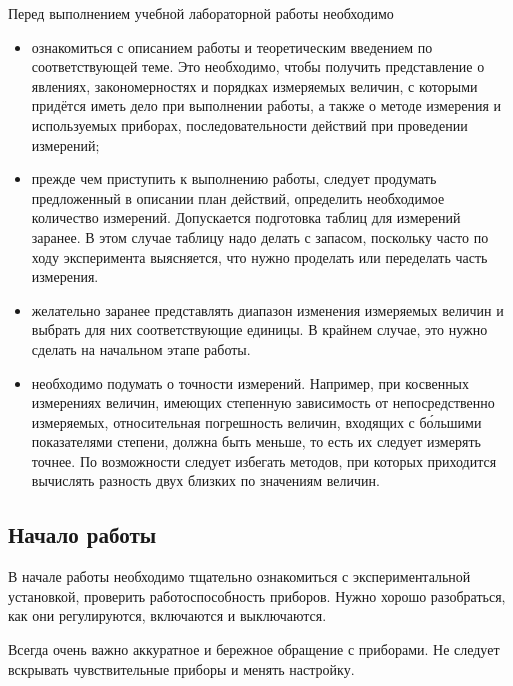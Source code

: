 Перед выполнением учебной лабораторной работы необходимо
\begin{itemize}
    \item ознакомиться с описанием работы и теоретическим введением по соответствующей
теме. Это необходимо, чтобы получить представление о явлениях, закономерностях
и порядках измеряемых величин, с которыми придётся иметь дело при
выполнении работы, а также о методе измерения и используемых приборах,
последовательности действий при проведении измерений;

    \item прежде чем приступить к выполнению работы, следует продумать предложенный
в описании план действий, определить необходимое количество измерений.
Допускается подготовка таблиц для измерений заранее. В этом случае таблицу надо делать с запасом, поскольку часто по ходу эксперимента выясняется, что нужно проделать или переделать часть измерения.

    \item желательно заранее представлять диапазон изменения измеряемых величин
и выбрать для них соответствующие единицы. В крайнем случае, это нужно
сделать на начальном этапе работы. 
    \item необходимо подумать о точности измерений. Например, при косвенных
измерениях величин, имеющих степенную зависимость от непосредственно
измеряемых, относительная погрешность величин, входящих с б\'{о}льшими
показателями степени, должна быть меньше, то есть их следует измерять
точнее. По возможности следует избегать методов, при которых приходится
вычислять разность двух близких по значениям величин.
\end{itemize}


\subsection{Начало работы}

В начале работы необходимо тщательно ознакомиться с экспериментальной
установкой, проверить работоспособность приборов. Нужно хорошо разобраться,
как они регулируются, включаются и выключаются.

Всегда очень важно аккуратное и бережное обращение с приборами. Не
следует вскрывать чувствительные приборы и менять настройку.

